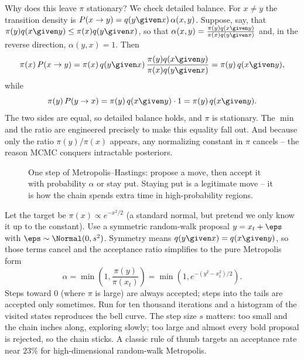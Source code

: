 \begin{whybox}
Why does this leave $\pi$ stationary? We check detailed balance. For $x \ne y$
the transition density is $P(x\to y) = q(y\given x)\,\alpha(x,y)$. Suppose, say,
that $\pi(y)q(x\given y) \le \pi(x)q(y\given x)$, so that
$\alpha(x,y) = \frac{\pi(y)q(x\given y)}{\pi(x)q(y\given x)}$ and, in the reverse
direction, $\alpha(y,x) = 1$. Then
\[
  \pi(x)\,P(x\to y) = \pi(x)\,q(y\given x)\,
     \frac{\pi(y)q(x\given y)}{\pi(x)q(y\given x)}
   = \pi(y)\,q(x\given y),
\]
while
\[
  \pi(y)\,P(y\to x) = \pi(y)\,q(x\given y)\cdot 1 = \pi(y)\,q(x\given y).
\]
The two sides are equal, so detailed balance holds, and $\pi$ is stationary. The
$\min$ and the ratio are engineered precisely to make this equality fall out. And
because only the ratio $\pi(y)/\pi(x)$ appears, any normalizing constant in $\pi$
cancels -- the reason MCMC conquers intractable posteriors.
\end{whybox}

\begin{figure}[H]
\centering
{}
\caption{One step of Metropolis--Hastings: propose a move, then accept it with
probability $\alpha$ or stay put. Staying put is a legitimate move -- it is how
the chain spends extra time in high-probability regions.}
\label{ch35:fig-mh-step}
\end{figure}

\begin{example}
\label{ch35:ex-mh-normal}
Let the target be $\pi(x) \propto e^{-x^2/2}$ (a standard normal, but pretend we
only know it up to the constant). Use a symmetric random-walk proposal
$y = x_t + \eps$ with $\eps \sim \Normal(0, s^2)$. Symmetry means
$q(y\given x) = q(x\given y)$, so those terms cancel and the acceptance ratio
simplifies to the pure Metropolis form
\[
  \alpha = \min\!\left(1, \frac{\pi(y)}{\pi(x_t)}\right)
         = \min\!\left(1, e^{-(y^2 - x_t^2)/2}\right).
\]
Steps toward $0$ (where $\pi$ is large) are always accepted; steps into the tails
are accepted only sometimes. Run for ten thousand iterations and a histogram of
the visited states reproduces the bell curve. The step size $s$ matters: too
small and the chain inches along, exploring slowly; too large and almost every
bold proposal is rejected, so the chain sticks. A classic rule of thumb targets
an acceptance rate near $23\%$ for high-dimensional random-walk Metropolis.
\end{example}


